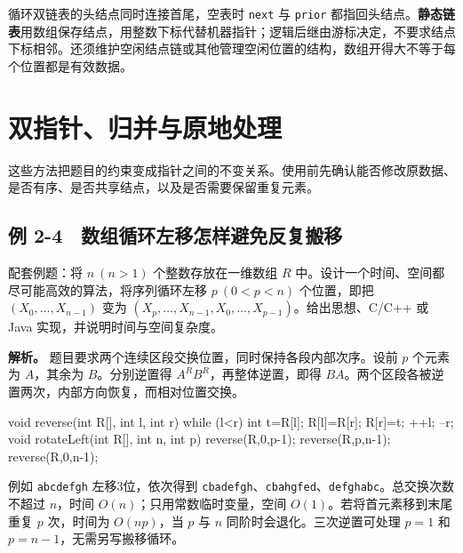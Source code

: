 循环双链表的头结点同时连接首尾，空表时 \texttt{next} 与 \texttt{prior} 都指回头结点。\textbf{静态链表}用数组保存结点，用整数下标代替机器指针；逻辑后继由游标决定，不要求结点下标相邻。还须维护空闲结点链或其他管理空闲位置的结构，数组开得大不等于每个位置都是有效数据。

\section{双指针、归并与原地处理}\label{DS02-05}

这些方法把题目的约束变成指针之间的不变关系。使用前先确认能否修改原数据、是否有序、是否共享结点，以及是否需要保留重复元素。

\subsection{例 2-4　数组循环左移怎样避免反复搬移}\label{DS02-ex4}

\begin{example}[配套例题]

配套例题：将 \(n\ (n>1)\) 个整数存放在一维数组 \(R\) 中。设计一个时间、空间都尽可能高效的算法，将序列循环左移 \(p\ (0<p<n)\) 个位置，即把 \((X_0,\ldots,X_{n-1})\) 变为 \((X_p,\ldots,X_{n-1},X_0,\ldots,X_{p-1})\)。给出思想、C/C++ 或 Java 实现，并说明时间与空间复杂度。

\end{example}

\textbf{解析。} 题目要求两个连续区段交换位置，同时保持各段内部次序。设前 \(p\) 个元素为 \(A\)，其余为 \(B\)。分别逆置得 \(A^RB^R\)，再整体逆置，即得 \(BA\)。两个区段各被逆置两次，内部方向恢复，而相对位置交换。

\par\medskip\noindent\begin{minipage}{\linewidth}
\begin{codeblock}[language=C]
void reverse(int R[], int l, int r) {
    while (l<r) {
        int t=R[l]; R[l]=R[r]; R[r]=t;
        ++l; --r;
    }
}
void rotateLeft(int R[], int n, int p) {
    reverse(R,0,p-1);
    reverse(R,p,n-1);
    reverse(R,0,n-1);
}
\end{codeblock}
\end{minipage}\par\medskip

例如 \texttt{abcdefgh} 左移3位，依次得到 \texttt{cbadefgh}、\texttt{cbahgfed}、\texttt{defghabc}。总交换次数不超过 \(n\)，时间 \(O(n)\)；只用常数临时变量，空间 \(O(1)\)。若将首元素移到末尾重复 \(p\) 次，时间为 \(O(np)\)，当 \(p\) 与 \(n\) 同阶时会退化。三次逆置可处理 \(p=1\) 和 \(p=n-1\)，无需另写搬移循环。

